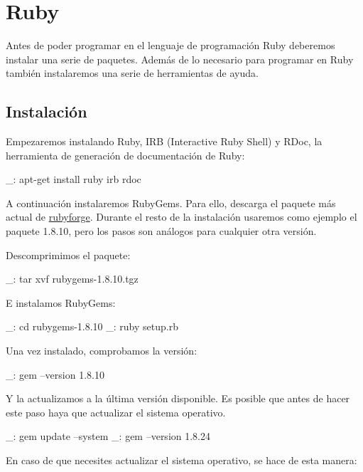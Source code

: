 \chapter{Ruby}
\label{comun:ruby}

Antes de poder programar en el lenguaje de programación Ruby deberemos instalar una serie de paquetes. Además de lo necesario para programar en Ruby también instalaremos una serie de herramientas de ayuda.


\section{Instalación}

Empezaremos instalando Ruby, IRB (Interactive Ruby Shell) y RDoc, la herramienta de generación de documentación de Ruby:

\begin{bashcode}
_: apt-get install ruby irb rdoc
\end{bashcode}

A continuación instalaremos RubyGems. Para ello, descarga el paquete más actual de \href{http://rubyforge.org/frs/?group_id=126}{rubyforge}. Durante el resto de la instalación usaremos como ejemplo el paquete 1.8.10, pero los pasos son análogos para cualquier otra versión.

Descomprimimos el paquete:

\begin{bashcode}
_: tar xvf rubygems-1.8.10.tgz
\end{bashcode}

E instalamos RubyGems:

\begin{bashcode}
_: cd rubygems-1.8.10
_: ruby setup.rb
\end{bashcode}

Una vez instalado, comprobamos la versión:

\begin{bashcode}
_: gem --version
1.8.10
\end{bashcode}

Y la actualizamos a la última versión disponible. Es posible que antes de hacer este paso haya que actualizar el sistema operativo.

\begin{bashcode}
_: gem update --system
_: gem --version
1.8.24
\end{bashcode}

En caso de que necesites actualizar el sistema operativo, se hace de esta manera:

